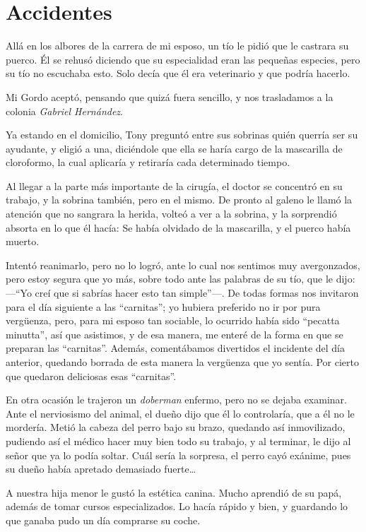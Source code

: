 \documentclass[letterpaper, 12pt]{book}
\begin{document}
\chapter{Accidentes}

Allá en los albores de la carrera de mi esposo, un tío le pidió que le castrara su puerco. Él se rehusó diciendo que su especialidad eran las pequeñas especies, pero su tío no escuchaba esto. Solo decía que él era veterinario y que podría hacerlo.

Mi Gordo aceptó, pensando que quizá fuera sencillo, y nos trasladamos a la colonia \textit{Gabriel Hernández}. 

Ya estando en el domicilio, Tony preguntó entre sus sobrinas quién querría ser su ayudante, y eligió a una, diciéndole que ella se haría cargo  de la mascarilla de cloroformo, la cual aplicaría y retiraría cada determinado tiempo.

Al llegar a la parte más importante de la cirugía, el doctor se concentró en su trabajo, y la sobrina también, pero en el mismo. De pronto al galeno le llamó la atención que no sangrara la herida, volteó a ver a la sobrina, y la sorprendió absorta en lo que él hacía: Se había olvidado de la mascarilla, y el puerco había muerto.

Intentó reanimarlo, pero no lo logró, ante lo cual nos sentimos muy avergonzados, pero estoy segura que yo más, sobre todo ante las palabras de su tío, que le dijo: ---``Yo creí que si sabrías hacer esto tan simple''---. De todas formas nos invitaron para el día siguiente a las ``carnitas''; yo hubiera preferido no ir por pura vergüenza, pero, para mi esposo tan sociable, lo ocurrido había sido ``pecatta minutta'', así que asistimos, y de esa manera, me enteré de la forma en que se preparan las ``carnitas''. Además, comentábamos divertidos el incidente del día anterior, quedando borrada de esta manera la vergüenza que yo sentía. Por cierto que quedaron deliciosas esas ``carnitas''.

En otra ocasión le trajeron un \textit{doberman} enfermo, pero no se dejaba examinar. Ante el nerviosismo del animal, el dueño dijo que él lo controlaría, que a él no le mordería. Metió la cabeza del perro bajo su brazo, quedando así inmovilizado, pudiendo así el médico hacer muy bien todo su trabajo, y al terminar, le dijo al señor que ya lo podía soltar. Cuál sería la sorpresa, el perro cayó exánime, pues su dueño había apretado demasiado fuerte\ldots


A nuestra hija menor le gustó la estética canina. Mucho aprendió de su papá, además de tomar cursos especializados. Lo hacía rápido y bien, y guardando lo que ganaba pudo un día comprarse su coche.
\end{document}
